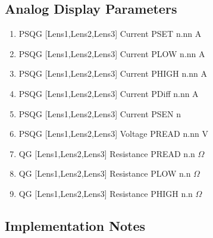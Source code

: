 \documentclass[11pt]{book}		%
\begin{document}
\subsection{Analog Display Parameters} \label{sect:cyc-op-interface-status-beamline-tofc1-analog-display}

\begin{enumerate}
 \item PSQG [Lens1,Lens2,Lens3] Current PSET  n.nn A
 \item PSQG [Lens1,Lens2,Lens3] Current PLOW  n.nn A
 \item PSQG [Lens1,Lens2,Lens3] Current PHIGH n.nn A
 \item PSQG [Lens1,Lens2,Lens3] Current PDiff n.nn A
 \item PSQG [Lens1,Lens2,Lens3] Current PSEN  n
 \item PSQG [Lens1,Lens2,Lens3] Voltage PREAD n.nn V
 \item QG [Lens1,Lens2,Lens3] Resistance PREAD n.n $\Omega$
 \item QG [Lens1,Lens2,Lens3] Resistance PLOW n.n $\Omega$
 \item QG [Lens1,Lens2,Lens3] Resistance PHIGH n.n $\Omega$
\end{enumerate}

\subsection{Implementation Notes} \label{sect:cyc-op-interface-status-beamline-tofc1-implementation-notes}
\end{document}
